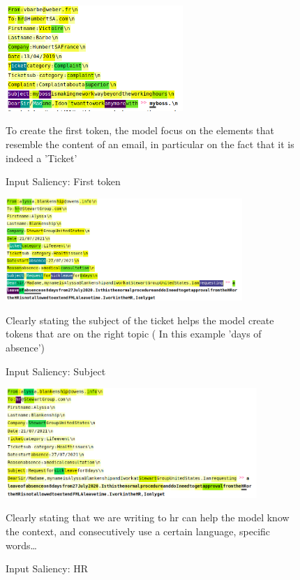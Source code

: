 \begin{figure}[h!] 
    \includegraphics[width=0.6\textwidth]{images/Screenshot from 2022-11-26 17-19-27}
    \caption{Input Saliency: First token}
    \medskip
    \footnotesize
    To create the first token, the model focus on the elements that resemble the content of an email, in particular on the fact that it is indeed a 'Ticket'
    \label{fig:first_token}
\end{figure}    

\begin{figure}[h!] 
    \includegraphics[width=0.8\textwidth]{images/Screenshot from 2022-11-26 18-18-28}
    \caption{Input Saliency: Subject}
    \medskip
    \footnotesize	
    Clearly stating the subject of the ticket helps the model create tokens that are on the right topic ( In this example 'days of absence')
    \label{fig:topic}
\end{figure}    

\begin{figure}[h!] 
    \includegraphics[width=0.85\textwidth]{images/Screenshot from 2022-11-26 18-18-40.png}
    \caption{Input Saliency: HR}
    \medskip
    \footnotesize
    Clearly stating that we are writing to hr can help the model know the context, and consecutively use a certain language, specific words\dots
    \label{fig:hr}
\end{figure}    


